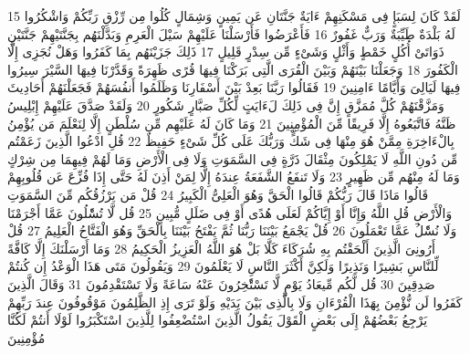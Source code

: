 \documentclass[20pt,a4paper]{article}
\begin{document}
{\tiny\colorbox{cl_aya}{15}} لَقَدْ كَانَ لِسَبَإٍ فِى مَسْكَنِهِمْ ءَايَةٌ جَنَّتَانِ عَن يَمِينٍ وَشِمَالٍ كُلُوا مِن رِّزْقِ رَبِّكُمْ وَاشْكُرُوا لَهُ بَلْدَةٌ طَيِّبَةٌ وَرَبٌّ غَفُورٌ
{\tiny\colorbox{cl_aya}{16}} فَأَعْرَضُوا فَأَرْسَلْنَا عَلَيْهِمْ سَيْلَ الْعَرِمِ وَبَدَّلْنَهُم بِجَنَّتَيْهِمْ جَنَّتَيْنِ ذَوَاتَىْ أُكُلٍ خَمْطٍ وَأَثْلٍ وَشَىْءٍ مِّن سِدْرٍ قَلِيلٍ
{\tiny\colorbox{cl_aya}{17}} ذَلِكَ جَزَيْنَهُم بِمَا كَفَرُوا وَهَلْ نُجَزِى إِلَّا الْكَفُورَ
{\tiny\colorbox{cl_aya}{18}} وَجَعَلْنَا بَيْنَهُمْ وَبَيْنَ الْقُرَى الَّتِى بَرَكْنَا فِيهَا قُرًى ظَهِرَةً وَقَدَّرْنَا فِيهَا السَّيْرَ سِيرُوا فِيهَا لَيَالِىَ وَأَيَّامًا ءَامِنِينَ
{\tiny\colorbox{cl_aya}{19}} فَقَالُوا رَبَّنَا بَعِدْ بَيْنَ أَسْفَارِنَا وَظَلَمُوا أَنفُسَهُمْ فَجَعَلْنَهُمْ أَحَادِيثَ وَمَزَّقْنَهُمْ كُلَّ مُمَزَّقٍ إِنَّ فِى ذَلِكَ لَءَايَتٍ لِّكُلِّ صَبَّارٍ شَكُورٍ
{\tiny\colorbox{cl_aya}{20}} وَلَقَدْ صَدَّقَ عَلَيْهِمْ إِبْلِيسُ ظَنَّهُ فَاتَّبَعُوهُ إِلَّا فَرِيقًا مِّنَ الْمُؤْمِنِينَ
{\tiny\colorbox{cl_aya}{21}} وَمَا كَانَ لَهُ عَلَيْهِم مِّن سُلْطَنٍ إِلَّا لِنَعْلَمَ مَن يُؤْمِنُ بِالْءَاخِرَةِ مِمَّنْ هُوَ مِنْهَا فِى شَكٍّ وَرَبُّكَ عَلَى كُلِّ شَىْءٍ حَفِيظٌ
{\tiny\colorbox{cl_aya}{22}} قُلِ ادْعُوا الَّذِينَ زَعَمْتُم مِّن دُونِ اللَّهِ لَا يَمْلِكُونَ مِثْقَالَ ذَرَّةٍ فِى السَّمَوَتِ وَلَا فِى الْأَرْضِ وَمَا لَهُمْ فِيهِمَا مِن شِرْكٍ وَمَا لَهُ مِنْهُم مِّن ظَهِيرٍ
{\tiny\colorbox{cl_aya}{23}} وَلَا تَنفَعُ الشَّفَعَةُ عِندَهُ إِلَّا لِمَنْ أَذِنَ لَهُ حَتَّى إِذَا فُزِّعَ عَن قُلُوبِهِمْ قَالُوا مَاذَا قَالَ رَبُّكُمْ قَالُوا الْحَقَّ وَهُوَ الْعَلِىُّ الْكَبِيرُ
{\tiny\colorbox{cl_aya}{24}} قُلْ مَن يَرْزُقُكُم مِّنَ السَّمَوَتِ وَالْأَرْضِ قُلِ اللَّهُ وَإِنَّا أَوْ إِيَّاكُمْ لَعَلَى هُدًى أَوْ فِى ضَلَلٍ مُّبِينٍ
{\tiny\colorbox{cl_aya}{25}} قُل لَّا تُسَْٔلُونَ عَمَّا أَجْرَمْنَا وَلَا نُسَْٔلُ عَمَّا تَعْمَلُونَ
{\tiny\colorbox{cl_aya}{26}} قُلْ يَجْمَعُ بَيْنَنَا رَبُّنَا ثُمَّ يَفْتَحُ بَيْنَنَا بِالْحَقِّ وَهُوَ الْفَتَّاحُ الْعَلِيمُ
{\tiny\colorbox{cl_aya}{27}} قُلْ أَرُونِىَ الَّذِينَ أَلْحَقْتُم بِهِ شُرَكَاءَ كَلَّا بَلْ هُوَ اللَّهُ الْعَزِيزُ الْحَكِيمُ
{\tiny\colorbox{cl_aya}{28}} وَمَا أَرْسَلْنَكَ إِلَّا كَافَّةً لِّلنَّاسِ بَشِيرًا وَنَذِيرًا وَلَكِنَّ أَكْثَرَ النَّاسِ لَا يَعْلَمُونَ
{\tiny\colorbox{cl_aya}{29}} وَيَقُولُونَ مَتَى هَذَا الْوَعْدُ إِن كُنتُمْ صَدِقِينَ
{\tiny\colorbox{cl_aya}{30}} قُل لَّكُم مِّيعَادُ يَوْمٍ لَّا تَسْتَْٔخِرُونَ عَنْهُ سَاعَةً وَلَا تَسْتَقْدِمُونَ
{\tiny\colorbox{cl_aya}{31}} وَقَالَ الَّذِينَ كَفَرُوا لَن نُّؤْمِنَ بِهَذَا الْقُرْءَانِ وَلَا بِالَّذِى بَيْنَ يَدَيْهِ وَلَوْ تَرَى إِذِ الظَّلِمُونَ مَوْقُوفُونَ عِندَ رَبِّهِمْ يَرْجِعُ بَعْضُهُمْ إِلَى بَعْضٍ الْقَوْلَ يَقُولُ الَّذِينَ اسْتُضْعِفُوا لِلَّذِينَ اسْتَكْبَرُوا لَوْلَا أَنتُمْ لَكُنَّا مُؤْمِنِينَ
\end{document}
